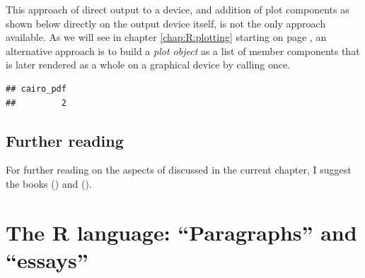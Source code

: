 \documentclass[krantz2]{krantz}\usepackage{knitr}
\begin{document}
\begin{warningbox}
This approach of direct output to a device, and addition of plot components as shown below directly on the output device itself, is not the only approach available. As we will see in chapter \ref{chap:R:plotting} starting on page \pageref{chap:R:plotting}, an alternative approach is to build a \emph{plot object} as a list of member components that is later rendered as a whole on a graphical device by calling  once.

\begin{knitrout}\footnotesize
{}\color{fgcolor}\begin{kframe}
\begin{alltt}
\hlstd{(} \hlstd{=} \hlstd{,}  \hlstd{=} \hlstd{,}  \hlstd{=} \hlstd{)}
 \hlopt{~}   
\hlstd{(} \hlstd{=} \hlstd{,}  \hlstd{=} \hlstd{,}  \hlstd{=} \hlstd{)}
\hlstd{()}
\end{alltt}
\begin{verbatim}
## cairo_pdf 
##         2
\end{verbatim}
\end{kframe}
\end{knitrout}
\end{warningbox}

\section{Further reading}
For further reading on the aspects of \Rlang discussed in the current chapter,
 I suggest the books  (\citeauthor{Peng2016}) and  (\citeauthor{Matloff2011}).











\chapter{The R language: ``Paragraphs'' and ``essays''}\label{chap:R:scripts}
\end{document}
